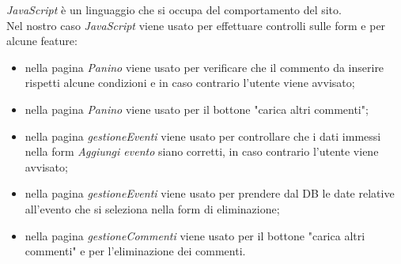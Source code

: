 \emph{JavaScript} è un linguaggio che si occupa del comportamento del sito.\\
Nel nostro caso \emph{JavaScript} viene usato per effettuare controlli sulle form e per alcune feature:
\begin{itemize}
    \item nella pagina \emph{Panino} viene usato per verificare che il commento da inserire rispetti alcune condizioni e in caso contrario l'utente viene avvisato;
    \item nella pagina \emph{Panino} viene usato per il bottone "carica altri commenti";
    \item nella pagina \emph{gestioneEventi} viene usato per controllare che i dati immessi nella form \emph{Aggiungi evento} siano corretti, in caso contrario l'utente viene avvisato;
    \item nella pagina \emph{gestioneEventi} viene usato per prendere dal DB le date relative all'evento che si seleziona nella form di eliminazione;
    \item nella pagina \emph{gestioneCommenti} viene usato per il bottone "carica altri commenti" e per l'eliminazione dei commenti.
\end{itemize}


